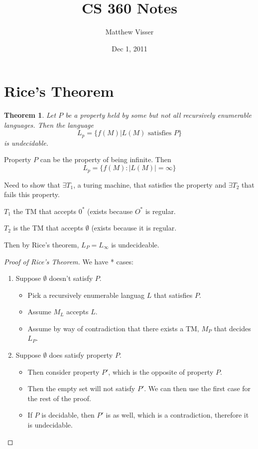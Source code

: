 \documentclass[12pt]{article}
\newtheorem{thm}{Theorem}
\begin{document}
\title{CS 360 Notes}
\author{Matthew Visser}
\date{Dec  1, 2011}
\maketitle

\section{Rice's Theorem}
\begin{thm}
	Let $P$ be a property held by some but not all recursively enumerable
	languages. Then the language
	\begin{equation}
		L_p = \{f(M) | L(M) \text{ satisfies } P \}
	\end{equation}
	is undecidable.
\end{thm}

Property $P$ can be the property of being infinite. Then
\begin{equation}
	L_p = \{ f(M) : |L(M)| = \infty \}
\end{equation}

Need to show that $\exists T_1$, a turing machine, that satisfies the property and
$\exists T_2$  that fails this property.

$T_1$ the TM that accepts $0^*$ (exists because $O^*$ is regular.

$T_2$ is the TM that accepts $\emptyset$ (exists because it is regular.

Then by Rice's theorem, $L_P = L_{\infty}$ is undecideable.

\begin{proof}[Proof of Rice's Theorem]
	We have * cases:
	\begin{enumerate}
				
		\item Suppose $\emptyset$ doesn't satisfy $P$.
			\begin{itemize}
				\item Pick a recursively enumerable languag $L$ that satisfies
					$P$.
				\item Assume $M_L$ accepts $L$.
				\item Assume by way of contradiction that there exists a TM,
					$M_P$ that decides $L_P$.
			\end{itemize}
		\item Suppose $\emptyset$ does satisfy property $P$.
			\begin{itemize}
				\item Then consider property $P'$, which is the opposite of
					property $P$.
				\item Then the empty set will not satisfy $P'$. We can then use
					the first case for the rest of the proof.
				\item If $P$ is decidable, then $P'$ is as well, which is a
					contradiction, therefore it is undecidable.
			\end{itemize}
	\end{enumerate}
\end{proof}
\end{document}
